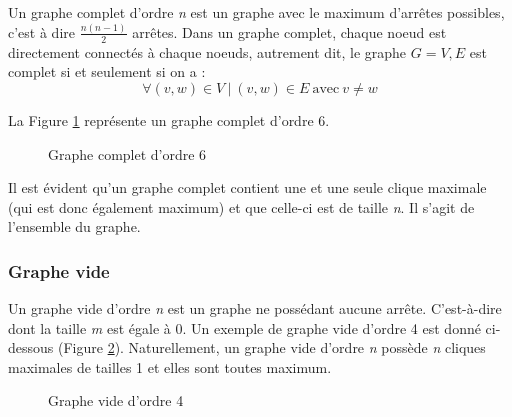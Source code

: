 \documentclass[12pt,a4paper]{article}
\begin{document}
Un graphe complet d'ordre \emph{n} est un graphe avec le maximum d'arrêtes possibles, c'est à dire \(\frac{n(n-1)}{2}\) arrêtes. Dans un graphe complet, chaque noeud est directement connectés à chaque noeuds, autrement dit, le graphe \(G = V, E\) est complet si et seulement si on a :
\begin{equation}
\forall (v,w) \in V \ | \ (v, w) \in E \ \text{avec} \ v \neq w
\end{equation}

La Figure \ref{fig:k6} représente un graphe complet d'ordre 6.

\begin{figure}[h!]
    \centering
    \caption{Graphe complet d'ordre 6}
    \label{fig:k6}
\end{figure}

Il est évident qu'un graphe complet contient une et une seule clique maximale (qui est donc également maximum) et que celle-ci est de taille \emph{n}. Il s'agit de l'ensemble du graphe.

\subsubsection*{Graphe vide}
\label{subsubsec:vide}

Un graphe vide d'ordre \emph{n} est un graphe ne possédant aucune arrête. C'est-à-dire dont la taille \emph{m} est égale à 0. Un exemple de graphe vide d'ordre 4 est donné ci-dessous (Figure \ref{fig:vide}).
Naturellement, un graphe vide d'ordre \emph{n} possède \emph{n} cliques maximales de tailles 1 et elles sont toutes maximum.

\begin{figure}[h!]
  \centering
  \caption{Graphe vide d'ordre 4}
  \label{fig:vide}
\end{figure}
\end{document}
